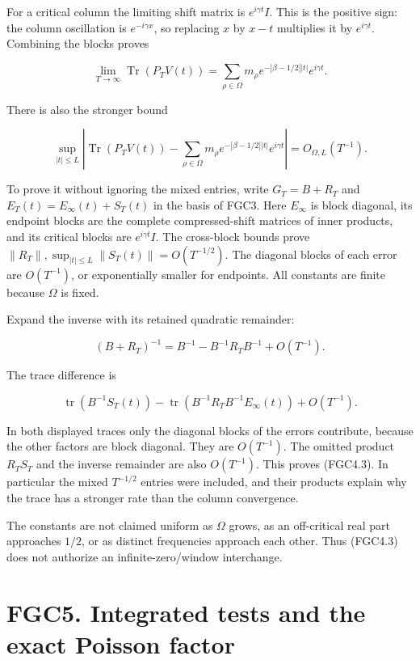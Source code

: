 For a critical column the limiting shift matrix is \(e^{i\gamma t}I\).
This is the positive sign: the column oscillation is \(e^{-i\gamma x}\),
so replacing \(x\) by \(x-t\) multiplies it by \(e^{i\gamma t}\).
Combining the blocks proves

\[
 \lim_{T\to\infty}\operatorname{Tr}(P_TV(t))
 =\sum_{\rho\in\Omega}m_\rho
 e^{-|\beta-1/2||t|}e^{i\gamma t}.
\tag{FGC4.2}
\]

There is also the stronger bound

\[
 \sup_{|t|\leq L}\left|
 \operatorname{Tr}(P_TV(t))-
 \sum_{\rho\in\Omega}m_\rho e^{-|\beta-1/2||t|}e^{i\gamma t}
 \right|=O_{\Omega,L}(T^{-1}).
\tag{FGC4.3}
\]

To prove it without ignoring the mixed entries, write \(G_T=B+R_T\) and
\(E_T(t)=E_\infty(t)+S_T(t)\) in the basis of FGC3. Here \(E_\infty\) is
block diagonal, its endpoint blocks are the complete compressed-shift
matrices of inner products, and its critical blocks are
\(e^{i\gamma t}I\). The cross-block bounds prove
\(\|R_T\|,\sup_{|t|\leq L}\|S_T(t)\|=O(T^{-1/2})\). The diagonal blocks
of each error are \(O(T^{-1})\), or exponentially smaller for endpoints.
All constants are finite because \(\Omega\) is fixed.

Expand the inverse with its retained quadratic remainder:

\[
 (B+R_T)^{-1}=B^{-1}-B^{-1}R_TB^{-1}+O(T^{-1}).
\]

The trace difference is

\[
 \operatorname{tr}(B^{-1}S_T(t))
 -\operatorname{tr}(B^{-1}R_TB^{-1}E_\infty(t))
 +O(T^{-1}).
\tag{FGC4.4}
\]

In both displayed traces only the diagonal blocks of the errors
contribute, because the other factors are block diagonal. They are
\(O(T^{-1})\). The omitted product \(R_TS_T\) and the inverse remainder
are also \(O(T^{-1})\). This proves (FGC4.3). In particular the mixed
\(T^{-1/2}\) entries were included, and their products explain why the
trace has a stronger rate than the column convergence.

The constants are not claimed uniform as \(\Omega\) grows, as an
off-critical real part approaches \(1/2\), or as distinct frequencies
approach each other. Thus (FGC4.3) does not authorize an
infinite-zero/window interchange.

\section{FGC5. Integrated tests and the exact Poisson
factor}\label{fgc5.-integrated-tests-and-the-exact-poisson-factor}

